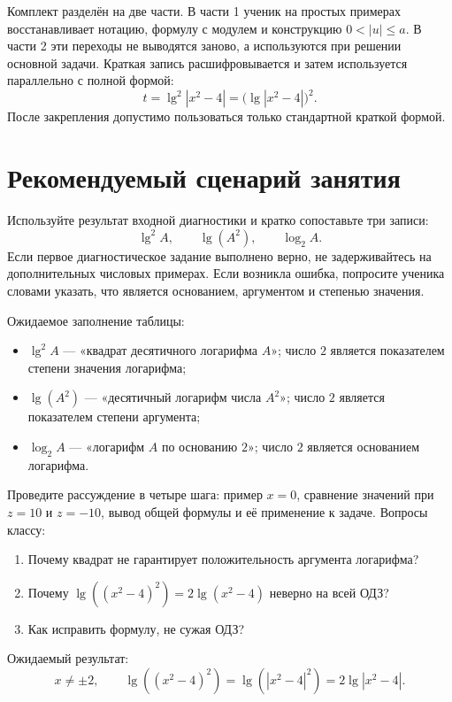 \begin{teacherbox}
  Комплект разделён на две части. В части 1 ученик на простых примерах
  восстанавливает нотацию, формулу с модулем и конструкцию
  \(0<|u|\le a\). В части 2 эти переходы не выводятся заново, а
  используются при решении основной задачи. Краткая запись расшифровывается
  и затем используется параллельно с полной формой:
  \[
    t=\lg^2|x^2-4|=\bigl(\lg|x^2-4|\bigr)^2.
  \]
  После закрепления допустимо пользоваться только стандартной краткой формой.
\end{teacherbox}

\notationtrianglefigure
\logchainteacherfigure

\section{Рекомендуемый сценарий занятия}

\begin{teacherbox}
  Используйте результат входной диагностики и кратко сопоставьте три записи:
  \[
    \lg^2 A,
    \qquad
    \lg(A^2),
    \qquad
    \log_2 A.
  \]
  Если первое диагностическое задание выполнено верно, не задерживайтесь на
  дополнительных числовых примерах. Если возникла ошибка, попросите ученика
  словами указать, что является основанием, аргументом и степенью значения.

  Ожидаемое заполнение таблицы:
  \begin{itemize}[itemsep=0.2em,topsep=0.25em]
    \item \(\lg^2 A\) --- «квадрат десятичного логарифма \(A\)»;
      число \(2\) является показателем степени значения логарифма;
    \item \(\lg(A^2)\) --- «десятичный логарифм числа \(A^2\)»;
      число \(2\) является показателем степени аргумента;
    \item \(\log_2 A\) --- «логарифм \(A\) по основанию \(2\)»;
      число \(2\) является основанием логарифма.
  \end{itemize}
\end{teacherbox}

\begin{teacherbox}
  Проведите рассуждение в четыре шага: пример \(x=0\), сравнение значений
  при \(z=10\) и \(z=-10\), вывод общей формулы и её применение к задаче.
  Вопросы классу:
  \begin{enumerate}
    \item Почему квадрат не гарантирует положительность аргумента логарифма?
    \item Почему \(\lg((x^2-4)^2)=2\lg(x^2-4)\) неверно на всей ОДЗ?
    \item Как исправить формулу, не сужая ОДЗ?
  \end{enumerate}
  Ожидаемый результат:
  \[
    x\ne\pm2,
    \qquad
    \lg((x^2-4)^2)
      =\lg(|x^2-4|^2)
      =2\lg|x^2-4|.
  \]
\end{teacherbox}

